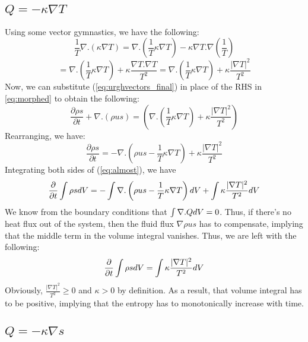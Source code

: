 \documentclass[english]{article}
\begin{document}
\subsection{$Q = -\kappa \nabla T$}
Using some vector gymnastics, we have the following:
$$
	\frac{1}{T}\nabla.(\kappa\nabla T) = 
	\nabla . (\frac{1}{T}\kappa \nabla T) -
	\kappa \nabla T.\nabla\left(\frac{1}{T}\right)
$$
\begin{equation}
	= \nabla . (\frac{1}{T}\kappa \nabla T) + 
	\kappa \frac{\nabla T.\nabla T}{T^{2}}
	= \nabla . (\frac{1}{T}\kappa \nabla T) + 
	\kappa \frac{|\nabla T|^{2}}{T^{2}}
	\label{eq:urghvectors_final}
\end{equation}
Now, we can substitute (\ref{eq:urghvectors_final}) in place of the RHS in
\ref{eq:morphed} to obtain the following:
$$
	\frac{\partial \rho s}{\partial t}+\nabla.(\rho us)=\left(
	\nabla . (\frac{1}{T}\kappa \nabla T) + 
	\kappa \frac{|\nabla T|^{2}}{T^{2}}
	\right)
$$
Rearranging, we have:
\begin{equation}
	\frac{\partial \rho s}{\partial t}=
	-\nabla.\left(\rho us - \frac{1}{T}\kappa \nabla T \right) 
	+\kappa \frac{|\nabla T|^{2}}{T^{2}}
	\label{eq:almost}
\end{equation}
Integrating both sides of (\ref{eq:almost}), we have
$$
	\frac{\partial}{\partial t} \intop \rho sdV=
	-\intop \nabla.\left(\rho us - \frac{1}{T}\kappa \nabla T \right) dV
	+\intop\kappa \frac{|\nabla T|^{2}}{T^{2}}dV
$$
We know from the boundary conditions that $\intop \nabla.QdV = 0$. Thus,
if there's no heat flux out of the system, then the fluid flux 
$\nabla \rho us$ has to compensate, implying that the middle term in the
volume integral vanishes.
Thus, we are left with the following:
\begin{equation}
	\frac{\partial}{\partial t} \intop \rho sdV=
	\intop\kappa \frac{|\nabla T|^{2}}{T^{2}}dV
	\label{eq:done}
\end{equation}
Obviously, $\frac{|\nabla T|^{2}}{T^{2}} \geq 0$ and $\kappa >0$ by 
definition. As a result, that volume integral has to be positive, implying
that the entropy has to monotonically increase with time.
\subsection{$Q=-\kappa \nabla s$}
\end{document}

